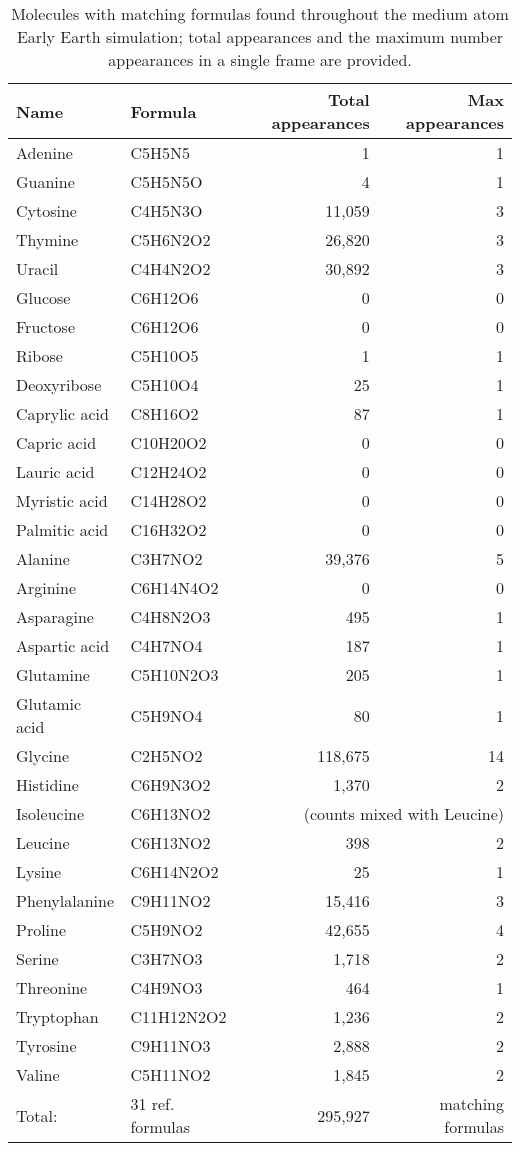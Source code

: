 \begin{table}[ht!]
\centering
\caption[Molecules with matching formulas found throughout the 228,000 atom run]{Molecules with matching formulas found throughout the medium atom Early Earth simulation; total appearances and the maximum number appearances in a single frame are provided.
}\label{tbl:228k_mol_counts}
\begin{tabularx}{0.775\textwidth}{llrr}  
\toprule
Name & Formula & Total appearances & Max appearances \\
\midrule
Adenine & C5H5N5 & 1  & 1 \\
Guanine & C5H5N5O & 4  & 1 \\ 
Cytosine & C4H5N3O & 11,059 & 3 \\
Thymine & C5H6N2O2 & 26,820 & 3 \\
Uracil & C4H4N2O2 & 30,892 & 3 \\
Glucose & C6H12O6 & 0 & 0 \\
Fructose & C6H12O6 & 0 & 0 \\
Ribose & C5H10O5 & 1 & 1 \\
Deoxyribose & C5H10O4 & 25 & 1 \\
Caprylic acid & C8H16O2 & 87 & 1 \\
Capric acid & C10H20O2 & 0 & 0 \\
Lauric acid & C12H24O2 & 0 & 0 \\
Myristic acid & C14H28O2 & 0 & 0 \\
Palmitic acid & C16H32O2 & 0 & 0 \\
Alanine & C3H7NO2 & 39,376 & 5 \\
Arginine & C6H14N4O2 & 0 & 0 \\
Asparagine & C4H8N2O3 & 495 & 1 \\
Aspartic acid & C4H7NO4 & 187 & 1 \\
Glutamine & C5H10N2O3 & 205 & 1 \\
Glutamic acid & C5H9NO4 & 80 & 1 \\
Glycine & C2H5NO2 & 118,675 & 14 \\
Histidine & C6H9N3O2 & 1,370 & 2 \\
Isoleucine & C6H13NO2 & \multicolumn{2}{r}{(counts mixed with Leucine)} \\
Leucine & C6H13NO2 & 398 & 2 \\
Lysine & C6H14N2O2 & 25 & 1 \\
Phenylalanine & C9H11NO2 & 15,416 & 3 \\
Proline & C5H9NO2 & 42,655 & 4 \\
Serine & C3H7NO3 & 1,718 & 2 \\
Threonine & C4H9NO3 & 464 & 1 \\
Tryptophan & C11H12N2O2 & 1,236 & 2 \\
Tyrosine & C9H11NO3 & 2,888 & 2 \\
Valine & C5H11NO2 & 1,845 & 2 \\
Total: & 31 ref. formulas & 295,927 & matching formulas \\
\bottomrule
\end{tabularx}
\end{table}


